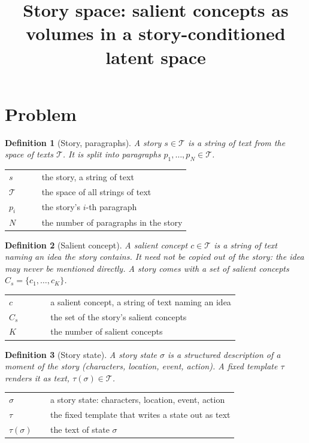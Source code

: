 \documentclass[11pt]{article}
\title{Story space: salient concepts as volumes in a story-conditioned latent space}
\date{}
\makeatletter
\newtheorem{definition}{Definition}
\theoremstyle{remark}
\newcommand{\T}{\mathcal{T}}
\newenvironment{symbols}
  {\par\smallskip\noindent\small\begin{tabular}{@{}>{$}l<{$}@{\quad}p{0.82\linewidth}@{}}}
  {\end{tabular}\par\medskip}
\makeatother
\begin{document}
\maketitle

\section{Problem}

\begin{definition}[Story, paragraphs]
A story $s \in \T$ is a string of text from the space of texts $\T$. It is split into paragraphs $p_1, \dots, p_N \in \T$.
\end{definition}
\begin{symbols}
s & the story, a string of text \\
\T & the space of all strings of text \\
p_i & the story's $i$-th paragraph \\
N & the number of paragraphs in the story \\
\end{symbols}

\begin{definition}[Salient concept]
A salient concept $c \in \T$ is a string of text naming an idea the story contains. It need not be copied out of the story: the idea may never be mentioned directly. A story comes with a set of salient concepts $C_s = \{c_1, \dots, c_K\}$.
\end{definition}
\begin{symbols}
c & a salient concept, a string of text naming an idea \\
C_s & the set of the story's salient concepts \\
K & the number of salient concepts \\
\end{symbols}

\begin{definition}[Story state]
A story state $\sigma$ is a structured description of a moment of the story (characters, location, event, action). A fixed template $\tau$ renders it as text, $\tau(\sigma) \in \T$.
\end{definition}
\begin{symbols}
\sigma & a story state: characters, location, event, action \\
\tau & the fixed template that writes a state out as text \\
\tau(\sigma) & the text of state $\sigma$ \\
\end{symbols}
\end{document}
